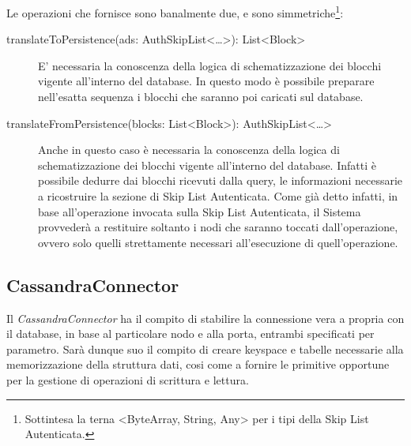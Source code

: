 		Le operazioni che fornisce sono banalmente due, e sono simmetriche\footnote{Sottintesa la terna <ByteArray, String, Any> per i tipi della Skip List Autenticata.}:
		\begin{description}
			\item[translateToPersistence(ads: AuthSkipList<\dots>): List<Block>] E' necessaria la conoscenza della logica di schematizzazione dei blocchi vigente all'interno del database. In questo modo è possibile preparare nell'esatta sequenza i blocchi che saranno poi caricati sul database.
			\item[translateFromPersistence(blocks: List<Block>): AuthSkipList<\dots>] Anche in questo caso è necessaria la conoscenza della logica di schematizzazione dei blocchi vigente all'interno del database. Infatti è possibile dedurre dai blocchi ricevuti dalla query, le informazioni necessarie a ricostruire la sezione di Skip List Autenticata. Come già detto infatti, in base all'operazione invocata sulla Skip List Autenticata, il Sistema provvederà a restituire soltanto i nodi che saranno toccati dall'operazione, ovvero solo quelli strettamente necessari all'esecuzione di quell'operazione.
		\end{description}
		
	\subsection{CassandraConnector}
	

		Il \textit{CassandraConnector} ha il compito di stabilire la connessione vera a propria con il database, in base al particolare nodo e alla porta, entrambi specificati per parametro. Sarà dunque suo il compito di creare keyspace e tabelle necessarie alla memorizzazione della struttura dati, cosi come a fornire le primitive opportune per la gestione di operazioni di scrittura e lettura.
		
